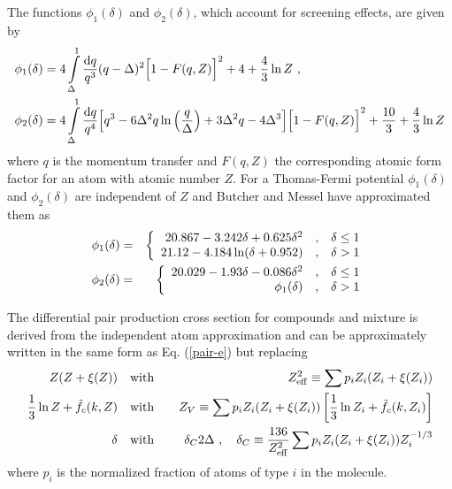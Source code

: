 The functions $\phi_1(\delta)$ and $\phi_2(\delta)$, which
account for screening effects, are
given by
\begin{equation}
\begin{split}
\phi_1(\delta) & = 4 \int\limits_\Delta^1 {{\rm d}q \over q^3}
(q - \Delta)^2 \Big[1 - F(q,Z) \Big]^2 + 4 + {4 \over 3} \ln Z~,
\\
\phi_2(\delta) & = 4 \int\limits_\Delta^1  {{\rm d}q \over q^4}
\Big[q^3 - 6 \Delta^2 q \ln \left({q \over \Delta}\right) + 3 \Delta^2 q
-4 \Delta^3 \Big] \Big[1 - F(q,Z) \Big]^2 + {10 \over 3} + {4 \over 3} \ln Z
\end{split}
\end{equation}
where $q$ is the momentum transfer and $F(q,Z)$ the corresponding
atomic form factor for an atom with atomic
number $Z$. For a Thomas-Fermi potential $\phi_1(\delta)$
and $\phi_2(\delta)$ are independent of $Z$ and Butcher and
Messel have approximated them \cite{BM60} as
\begin{eqnarray}
\label{pair_phi}
\phi_1(\delta) & = & \left\{
\begin{array}{r@{\quad , \quad}l}
20.867 - 3.242 \delta + 0.625 \delta^2 & \delta \le 1 \\
21.12 - 4.184 \ln(\delta + 0.952) & \delta > 1
\end{array}
\right. \\
\phi_2(\delta) & = & \left\{
\begin{array}{r@{\quad , \quad}l}
20.029 - 1.93 \delta - 0.086 \delta^2 & \delta \le 1 \\
\phi_1(\delta) & \delta > 1
\end{array}
\right.
\end{eqnarray}

The differential pair production cross section for compounds
and mixture is derived from the independent atom approximation
and can be approximately written in the same form as Eq. (\ref{pair-e})
but replacing
\begin{eqnarray}
\label{pair_replace}
Z (Z + \xi(Z)) \quad & \mbox{with} & \quad Z_{\rm eff}^2 \equiv
\sum p_i Z_i (Z_i + \xi(Z_i) )
\nonumber \\
{1 \over 3} \ln Z + \tilde{f}_c(k,Z) \quad & \mbox{with} & \quad
Z_V \equiv \sum p_i
Z_i (Z_i + \xi(Z_i) ) \left[ {1 \over 3} \ln Z_i + \tilde{f}_c(k,Z_i) \right]
\nonumber \\
\delta \quad & \mbox{with} & \quad \delta_C 2 \Delta~,\quad
\delta_C \equiv {136 \over Z_{\rm eff}^2}
\sum p_i Z_i (Z_i + \xi(Z_i) ) Z_i^{-1/3}
\end{eqnarray}
where $p_i$ is the normalized fraction of atoms of type $i$ in
the molecule.

